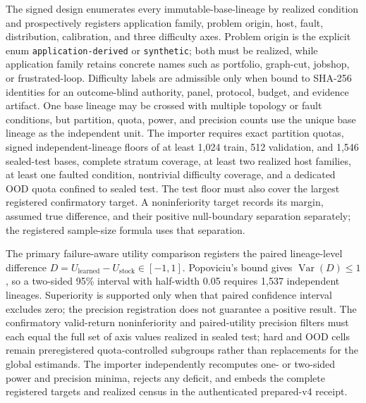 \documentclass[11pt,a4paper]{article}
\theoremstyle{definition}\newtheorem{definition}[proposition]{Definition}
\begin{document}
The signed design enumerates every immutable-base-lineage by realized condition and prospectively registers application family, problem origin, host, fault, distribution, calibration, and three difficulty axes. Problem origin is the explicit enum \texttt{application-derived} or \texttt{synthetic}; both must be realized, while application family retains concrete names such as portfolio, graph-cut, jobshop, or frustrated-loop. Difficulty labels are admissible only when bound to SHA-256 identities for an outcome-blind authority, panel, protocol, budget, and evidence artifact. One base lineage may be crossed with multiple topology or fault conditions, but partition, quota, power, and precision counts use the unique base lineage as the independent unit. The importer requires exact partition quotas, signed independent-lineage floors of at least 1,024 train, 512 validation, and 1,546 sealed-test bases, complete stratum coverage, at least two realized host families, at least one faulted condition, nontrivial difficulty coverage, and a dedicated OOD quota confined to sealed test. The test floor must also cover the largest registered confirmatory target. A noninferiority target records its margin, assumed true difference, and their positive null-boundary separation separately; the registered sample-size formula uses that separation.

The primary failure-aware utility comparison registers the paired lineage-level difference $D=U_{\mathrm{learned}}-U_{\mathrm{stock}}\in[-1,1]$. Popoviciu's bound gives $\operatorname{Var}(D)\leq1$, so a two-sided 95\% interval with half-width 0.05 requires 1,537 independent lineages. Superiority is supported only when that paired confidence interval excludes zero; the precision registration does not guarantee a positive result. The confirmatory valid-return noninferiority and paired-utility precision filters must each equal the full set of axis values realized in sealed test; hard and OOD cells remain preregistered quota-controlled subgroups rather than replacements for the global estimands. The importer independently recomputes one- or two-sided power and precision minima, rejects any deficit, and embeds the complete registered targets and realized census in the authenticated prepared-v4 receipt.
\end{document}
